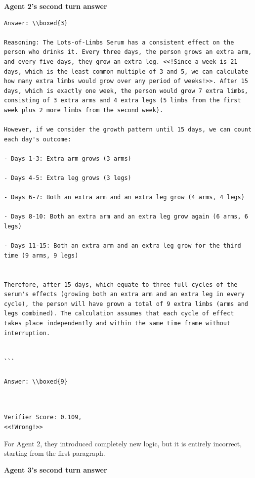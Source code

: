 \textbf{Agent 2's second turn answer }
\begin{lstlisting}[breaklines=true]
Answer: \\boxed{3}

Reasoning: The Lots-of-Limbs Serum has a consistent effect on the person who drinks it. Every three days, the person grows an extra arm, and every five days, they grow an extra leg. <<!Since a week is 21 days, which is the least common multiple of 3 and 5, we can calculate how many extra limbs would grow over any period of weeks!>>. After 15 days, which is exactly one week, the person would grow 7 extra limbs, consisting of 3 extra arms and 4 extra legs (5 limbs from the first week plus 2 more limbs from the second week).

However, if we consider the growth pattern until 15 days, we can count each day's outcome:

- Days 1-3: Extra arm grows (3 arms)

- Days 4-5: Extra leg grows (3 legs)

- Days 6-7: Both an extra arm and an extra leg grow (4 arms, 4 legs)

- Days 8-10: Both an extra arm and an extra leg grow again (6 arms, 6 legs)

- Days 11-15: Both an extra arm and an extra leg grow for the third time (9 arms, 9 legs)


Therefore, after 15 days, which equate to three full cycles of the serum's effects (growing both an extra arm and an extra leg in every cycle), the person will have grown a total of 9 extra limbs (arms and legs combined). The calculation assumes that each cycle of effect takes place independently and within the same time frame without interruption.


```

Answer: \\boxed{9}



\end{lstlisting}
\begin{lstlisting}
Verifier Score: 0.109,
<<!Wrong!>> 
\end{lstlisting}
For Agent 2, they introduced completely new logic, but it is entirely incorrect, starting from the first paragraph.

\textbf{Agent 3's second turn answer 
}

